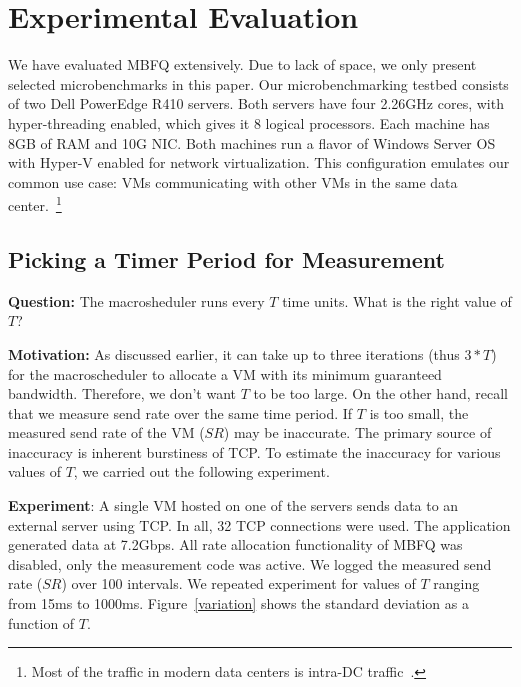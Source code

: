 \section{Experimental Evaluation}
\label{sec:experiments}

We have evaluated MBFQ extensively. Due to lack of space, we only present
selected microbenchmarks in this paper. Our microbenchmarking testbed consists
of two Dell PowerEdge R410 servers.  Both servers have four 2.26GHz cores, with
hyper-threading enabled, which gives it 8 logical processors.  Each machine has
8GB of RAM and 10G NIC.  Both machines run a flavor of Windows Server OS with
Hyper-V enabled for network virtualization. This configuration emulates our
common use case: VMs communicating with other VMs in the same data
center.~\footnote{Most of the traffic in modern data centers is intra-DC
traffic~\cite{fb,cosmos}.} 

\subsection{Picking a Timer Period for Measurement}
{\bf Question:}  The macrosheduler runs every $T$ time units. What is the right
value of $T$?

{\bf Motivation:}  As discussed earlier, it can take up to three iterations (thus
$3*T$) for the macroscheduler to allocate a VM with its minimum
guaranteed bandwidth. Therefore, we don't want $T$ to be too large. On the other hand,
recall that we measure send rate over the same time period. If $T$ is too small,
the measured send rate of the VM ($SR$) may be inaccurate. The primary source of
inaccuracy is inherent burstiness of TCP. To estimate the inaccuracy for
various values of $T$, we carried out the following experiment.

{\bf Experiment}: A single VM hosted on one of the servers sends data to
an external server using TCP. In all, 32 TCP connections were used. The application 
generated data at 7.2Gbps. All rate
allocation functionality of MBFQ was disabled, only the measurement code was
active.  We logged the measured send rate ($SR$) over 100 intervals.  We
repeated experiment for values of $T$ ranging from 15ms to 1000ms.
Figure~\ref{variation} shows the standard deviation as a function of $T$.  

